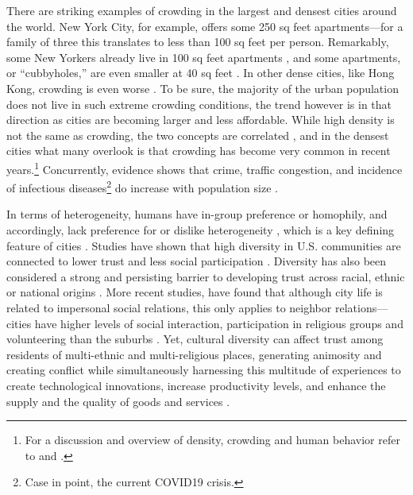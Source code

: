 \documentclass[11pt, letterpaper]{article}
\begin{document}
\begin{spacing}{1.4}
There are striking examples of crowding in the largest and densest cities around the world. New York City, for example, offers some 250 sq feet apartments---for a family of three this translates to less than 100 sq feet per person. Remarkably, some New Yorkers already live in 100 sq feet apartments \citep{abc,yoneda,dailynews}, and some apartments, or ``cubbyholes,'' are even smaller at 40 sq feet \citep{newyorktimes}. In other dense cities, like Hong Kong, crowding is even worse \citep{newyorktimes2}. To
  be sure, the majority of the urban population does not live in such extreme crowding conditions, the trend however is in that direction as cities are becoming larger and less affordable.  While high density is not the same as crowding, the two concepts are correlated \citep{meyer13}, and in the densest cities what many overlook is that crowding has become very common in recent years.\footnote{For a discussion and overview of density, crowding and human behavior refer to \citet{boots1979population,choldin1978urban} and \citet{ramsden09}.} 
Concurrently, evidence shows that crime, traffic congestion, and incidence of infectious diseases\footnote{Case in point, the current COVID19 crisis.} do increase with population size \citep{bettencourt10,bettencourt10b,bettencourt07}.

In terms of heterogeneity, humans have in-group preference or homophily, and
accordingly, lack preference for or dislike heterogeneity
\citep{smith14,mcpherson01,bleidorn16,putnam07}, which is a key defining feature of cities \citep{wirth38,amin06,thrift05}. Studies have shown that high diversity in U.S. communities are connected to lower trust and less social participation \citep{alesina99,alesina00,luttmer01,alesina02,rodriguez2019does}.  
Diversity has also been considered a strong and persisting barrier to developing trust across racial, ethnic or national origins \citep{glaeser00}. More recent studies, have found that although city life is related to impersonal social relations, this only applies to neighbor relations---cities have higher levels of social interaction, participation in religious groups and volunteering than the suburbs \citep{nguyen10,mazumdar18}. Yet, cultural diversity can affect trust among residents of multi-ethnic and multi-religious places, generating animosity and creating conflict while simultaneously harnessing this multitude of experiences to create technological innovations, increase productivity levels, and enhance the supply and the quality of goods and services \citet{rodriguez2019does}. 



\end{spacing}
\end{document}
